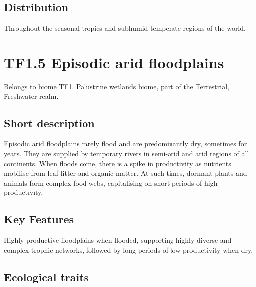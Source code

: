 \documentclass[
  letterpaper,
  DIV=11,
  numbers=noendperiod]{scrartcl}
\begin{document}
\subsection{Distribution}\label{distribution-106}

Throughout the seasonal tropics and subhumid temperate regions of the
world.

\section{TF1.5 Episodic arid
floodplains}\label{tf1.5-episodic-arid-floodplains}

Belongs to biome TF1. Palustrine wetlands biome, part of the
Terrestrial, Freshwater realm.

\subsection{Short description}\label{short-description-107}

Episodic arid floodplains rarely flood and are predominantly dry,
sometimes for years. They are supplied by temporary rivers in semi-arid
and arid regions of all continents. When floods come, there is a spike
in productivity as nutrients mobilise from leaf litter and organic
matter. At such times, dormant plants and animals form complex food
webs, capitalising on short periods of high productivity.

\subsection{Key Features}\label{key-features-107}

Highly productive floodplains when flooded, supporting highly diverse
and complex trophic networks, followed by long periods of low
productivity when dry.

\subsection{Ecological traits}\label{ecological-traits-107}
\end{document}
